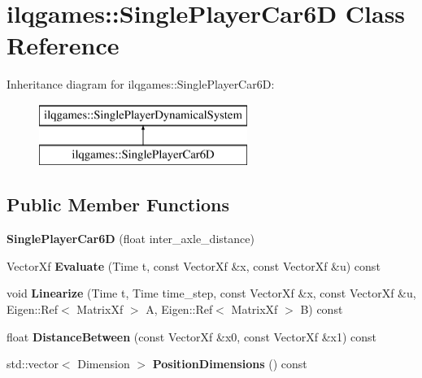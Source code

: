 \hypertarget{classilqgames_1_1_single_player_car6_d}{}\section{ilqgames\+:\+:Single\+Player\+Car6D Class Reference}
\label{classilqgames_1_1_single_player_car6_d}
Inheritance diagram for ilqgames\+:\+:Single\+Player\+Car6D\+:\begin{figure}[H]
\begin{center}
\leavevmode
\includegraphics[height=2.000000cm]{classilqgames_1_1_single_player_car6_d}
\end{center}
\end{figure}
\subsection*{Public Member Functions}
\begin{DoxyCompactItemize}
\item 
{\bfseries Single\+Player\+Car6D} (float inter\+\_\+axle\+\_\+distance)\hypertarget{classilqgames_1_1_single_player_car6_d_a1447d0191222caa085c9136e776b75a2}{}\label{classilqgames_1_1_single_player_car6_d_a1447d0191222caa085c9136e776b75a2}

\item 
Vector\+Xf {\bfseries Evaluate} (Time t, const Vector\+Xf \&x, const Vector\+Xf \&u) const \hypertarget{classilqgames_1_1_single_player_car6_d_a60e07c8bde8c99b24f674b78b61c1f82}{}\label{classilqgames_1_1_single_player_car6_d_a60e07c8bde8c99b24f674b78b61c1f82}

\item 
void {\bfseries Linearize} (Time t, Time time\+\_\+step, const Vector\+Xf \&x, const Vector\+Xf \&u, Eigen\+::\+Ref$<$ Matrix\+Xf $>$ A, Eigen\+::\+Ref$<$ Matrix\+Xf $>$ B) const \hypertarget{classilqgames_1_1_single_player_car6_d_a083dd0ed800f8f2f91d74cf6d619ad0e}{}\label{classilqgames_1_1_single_player_car6_d_a083dd0ed800f8f2f91d74cf6d619ad0e}

\item 
float {\bfseries Distance\+Between} (const Vector\+Xf \&x0, const Vector\+Xf \&x1) const \hypertarget{classilqgames_1_1_single_player_car6_d_a4874842c55f3591e26707e1440466ff6}{}\label{classilqgames_1_1_single_player_car6_d_a4874842c55f3591e26707e1440466ff6}

\item 
std\+::vector$<$ Dimension $>$ {\bfseries Position\+Dimensions} () const \hypertarget{classilqgames_1_1_single_player_car6_d_abd33eafcc1243df1bac72006fc8fd0f5}{}\label{classilqgames_1_1_single_player_car6_d_abd33eafcc1243df1bac72006fc8fd0f5}

\end{DoxyCompactItemize}
